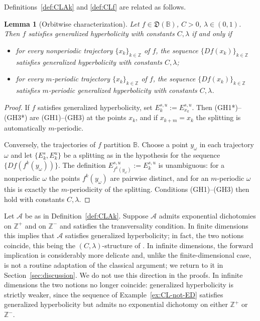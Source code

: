 \documentclass[12pt]{article}
\newcommand{\Bb}{\mathbb{B}}
\newcommand{\Zz}{\mathbb{Z}}
\newcommand{\DUC}{\mathfrak{D}}
\newtheorem{lem}[thm]{Lemma}
\theoremstyle{definition}
\newtheorem{remark}[thm]{Remark}
\begin{document}
Definitions~\ref{def:CLAk} and \ref{def:CLf} are related as follows.


\begin{lem}[Orbitwise characterization]\label{lem:orbitwise}
Let $f \in \DUC(\Bb)$, $C > 0$, $\lambda \in (0,1)$. Then $f$ satisfies generalized
hyperbolicity with constants $C, \lambda$ if and only if
\begin{itemize}
\item for every nonperiodic trajectory $\{x_k\}_{k \in \Zz}$ of $f$, the sequence
$\{Df(x_k)\}_{k \in \Zz}$ satisfies generalized hyperbolicity with constants $C, \lambda$;
\item for every $m$-periodic trajectory $\{x_k\}_{k \in \Zz}$ of $f$, the sequence
$\{Df(x_k)\}_{k \in \Zz}$ satisfies $m$-periodic generalized hyperbolicity with constants
$C, \lambda$.
\end{itemize}
\end{lem}
\begin{proof}
If $f$ satisfies generalized hyperbolicity, set $E^{s,u}_k := E^{s,u}_{x_k}$. Then
{\rm(GH1*)}--{\rm(GH3*)} are {\rm(GH1)}--{\rm(GH3)} at the points $x_k$, and if
$x_{k+m} = x_k$ the splitting is automatically $m$-periodic.

Conversely, the trajectories of $f$ partition $\Bb$. Choose a point $y_\omega$ in each
trajectory $\omega$ and let $\{E^s_k, E^u_k\}$ be a splitting as in the hypothesis for the
sequence $\{Df(f^k(y_\omega))\}$. The definition $E^{s,u}_{f^k(y_\omega)} := E^{s,u}_k$ is
unambiguous: for a nonperiodic $\omega$ the points $f^k(y_\omega)$ are pairwise distinct,
and for an $m$-periodic $\omega$ this is exactly the $m$-periodicity of the splitting.
Conditions {\rm(GH1)}--{\rm(GH3)} then hold with constants $C, \lambda$.
\end{proof}

Let $\mathcal{A}$ be as in Definition~\ref{def:CLAk}. 
Suppose $\mathcal{A}$ admits exponential dichotomies on $\Zz^+$ and on $\Zz^-$ and satisfies the transversality condition. In finite dimensions this implies that $\mathcal{A}$ satisfies generalized hyperbolicity; in fact, the two notions coincide, this being the $(C,\lambda)$-structure of \cite{PilCL}. In infinite dimensions, the forward implication is considerably more delicate and, unlike the finite-dimensional case, is not a routine adaptation of the classical argument; we return to it in Section~\ref{sec:discussion}. We do not use this direction in the proofs. In infinite dimensions the two notions no longer coincide: generalized hyperbolicity is strictly weaker, since the sequence of Example~\ref{ex:CL-not-ED} satisfies generalized hyperbolicity but admits no exponential dichotomy on either $\Zz^+$ or $\Zz^-$.
\end{document}
